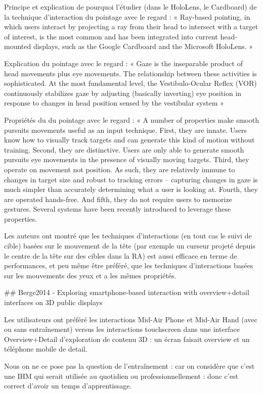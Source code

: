 Principe et explication de pourquoi l'étudier (dans le HoloLens, le Cardboard) de la technique d'interaction du pointage avec le regard : « Ray-based pointing, in which users interact by projecting a ray from their head to intersect with a target of interest, is the most common and has been integrated into current head-mounted displays, such as the Google Cardboard and the Microsoft HoloLens. »

Explication du pointage avec le regard : « Gaze is the inseparable product of head movements plus eye movements. The relationship between these activities is sophisticated. At the most fundamental level, the Vestibulo-Ocular Reflex (VOR) continuously stabilizes gaze by adjusting (basically inverting) eye position in response to changes in head position sensed by the vestibular system »

Propriétés du du pointage avec le regard : « A number of properties make smooth pursuits movements useful as an input technique. First, they are innate. Users know how to visually track targets and can generate this kind of motion without training. Second, they are distinctive. Users are only able to generate smooth pursuits eye movements in the presence of visually moving targets. Third, they operate on movement not position. As such, they are relatively immune to changes in target size and robust to tracking errors – capturing changes in gaze is much simpler than accurately determining what a user is looking at. Fourth, they are operated hands-free. And fifth, they do not require users to memorize gestures. Several systems have been recently introduced to leverage these properties.

Les auteurs ont montré que les techniques d'interactions (en tout cas le suivi de cible) basées sur le mouvement de la tête (par exemple un curseur projeté depuis le centre de la tête sur des cibles dans la RA) est aussi efficace en terme de performances, et peu même être préféré, que les techniques d'interactions basées sur les mouvements des yeux et a les mêmes propriétés.

## Berge2014 - Exploring smartphone-based interaction with overview+detail interfaces on 3D public displays

Les utilisateurs ont préféré les interactions Mid-Air Phone et Mid-Air Hand (avec ou sans entraînement) versus les interactions touchscreen dans une interface Overview+Detail d'exploration de contenu 3D : un écran faisait overview et un téléphone mobile de detail.

Nous on ne ce pose pas la question de l'entraînement : car on considère que c'est une IHM qui serait utilisée au quotidien ou professionnellement : donc c'est correct d'avoir un temps d'apprentissage.


